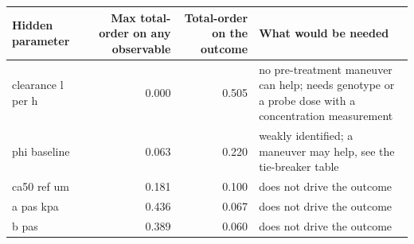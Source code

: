 \begin{tabular}{lrrp{5.4cm}}
\toprule
Hidden parameter & Max total-order on any observable & Total-order on the outcome & What would be needed \\
\midrule
clearance l per h & 0.000 & 0.505 & no pre-treatment maneuver can help; needs genotype or a probe dose with a concentration measurement \\
phi baseline & 0.063 & 0.220 & weakly identified; a maneuver may help, see the tie-breaker table \\
ca50 ref um & 0.181 & 0.100 & does not drive the outcome \\
a pas kpa & 0.436 & 0.067 & does not drive the outcome \\
b pas & 0.389 & 0.060 & does not drive the outcome \\
\bottomrule
\end{tabular}
